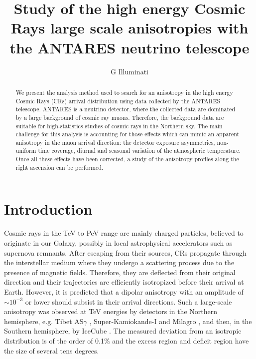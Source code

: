 \documentclass[a4paper]{jpconf}
\begin{document}
\title{Study of the high energy Cosmic Rays large scale anisotropies with the ANTARES neutrino telescope}

\author{G Illuminati}

\address{``La Sapienza'' University of Roma and INFN, Piazzale Aldo Moro, 5, 00185 Roma, Italy}



\begin{abstract}
We present the analysis method used to search for an anisotropy in the high energy Cosmic Rays (CRs) arrival distribution using data collected by the ANTARES telescope. ANTARES is a neutrino detector, where the collected data are dominated by a large background of cosmic ray muons. Therefore, the background data are suitable for high-statistics studies of cosmic rays in the Northern sky. The main challenge for this analysis is accounting for those effects which can mimic an apparent anisotropy in the muon arrival direction: the detector exposure asymmetries, non-uniform time coverage, diurnal and seasonal variation of the atmospheric temperature. Once all these effects have been corrected, a study of the anisotropy profiles along the right ascension can be performed.
\end{abstract}

\section{Introduction}
Cosmic rays in the TeV to PeV range are mainly charged particles, believed to originate in our Galaxy, possibly in local astrophysical accelerators such as supernova remnants. After escaping from their sources, CRs propagate through the interstellar medium where they undergo a scattering process due to the presence of magnetic fields. Therefore, they are deflected from their original direction and their trajectories are efficiently isotropized before their arrival at Earth. However, it is predicted that a dipolar anisotropy with an amplitude of $\sim 10^{-3}$ or lower should subsist in their arrival directions. Such a large-scale anisotropy was observed at TeV energies by detectors in the Northern hemisphere, e.g. Tibet AS$\gamma$ \cite{tibet}, Super-Kamiokande-I \cite{superk} and Milagro \cite{milagro}, and then, in the Southern hemisphere, by IceCube \cite{ice}. The measured deviation from an isotropic distribution is of the order of 0.1$\%$ and the excess region and deficit region have the size of several tens degrees. 
\end{document}
